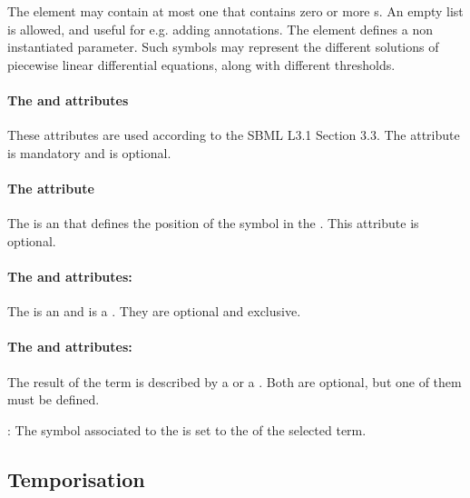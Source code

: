 The  element may contain at most one  that contains zero or more s. An empty list is allowed, and useful for e.g. adding annotations. 
The  element defines a non instantiated parameter. Such symbols may represent the different solutions of piecewise linear differential equations, along with different thresholds.

\paragraph{The  and  attributes}
These attributes are used according to the SBML L3.1 Section 3.3. The attribute  is mandatory and  is optional. 

\paragraph{The  attribute}
The  is an  that defines the position of the symbol in the . This attribute is optional.


\paragraph{The  and  attributes:} %
The  is an  and  is a . They are optional and exclusive.

\paragraph{The  and  attributes:} %
The result of the term is described by a  or a . Both are optional, but one of them must be defined.


: The symbol associated to the  is set to the  of the selected term.

\subsection{Temporisation}

